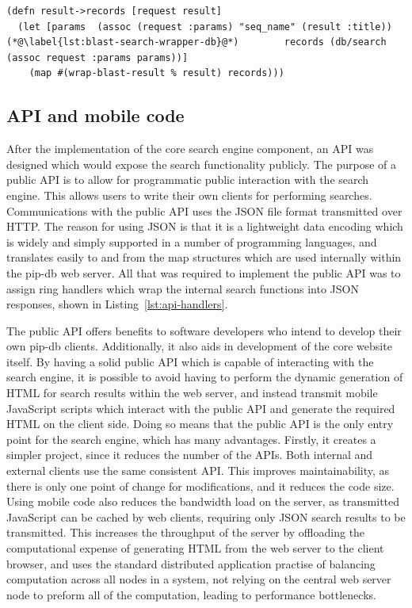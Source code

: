 \newpage


\lstset{language=clojure}
\begin{lstlisting}[label=lst:blast-search-wrapper,caption={%
      [BLAST search output processing]
       BLAST search output processing.}]
(defn result->records [request result]
  (let [params  (assoc (request :params) "seq_name" (result :title))
(*@\label{lst:blast-search-wrapper-db}@*)        records (db/search (assoc request :params params))]
    (map #(wrap-blast-result % result) records)))
\end{lstlisting}


\subsection{API and mobile code}\label{subsec:api}

After the implementation of the core search engine component, an API
was designed which would expose the search functionality publicly. The
purpose of a public API is to allow for programmatic public
interaction with the search engine. This allows users to write their
own clients for performing searches. Communications with the public
API uses the JSON file format transmitted over HTTP. The reason for
using JSON is that it is a lightweight data encoding which is widely
and simply supported in a number of programming languages, and
translates easily to and from the map structures which are used
internally within the pip-db web server. All that was required to
implement the public API was to assign ring handlers which wrap the
internal search functions into JSON responses, shown in
Listing~\ref{lst:api-handlers}.

The public API offers benefits to software developers who intend to
develop their own pip-db clients. Additionally, it also aids in
development of the core website itself. By having a solid public API
which is capable of interacting with the search engine, it is possible
to avoid having to perform the dynamic generation of HTML for search
results within the web server, and instead transmit mobile JavaScript
scripts which interact with the public API and generate the required
HTML on the client side. Doing so means that the public API is the
only entry point for the search engine, which has many
advantages. Firstly, it creates a simpler project, since it reduces
the number of the APIs. Both internal and external clients use the
same consistent API. This improves maintainability, as there is only
one point of change for modifications, and it reduces the code
size. Using mobile code also reduces the bandwidth load on the server,
as transmitted JavaScript can be cached by web clients, requiring only
JSON search results to be transmitted. This increases the throughput
of the server by offloading the computational expense of generating
HTML from the web server to the client browser, and uses the standard
distributed application practise of balancing computation across all
nodes in a system, not relying on the central web server node to
preform all of the computation, leading to performance bottlenecks.

